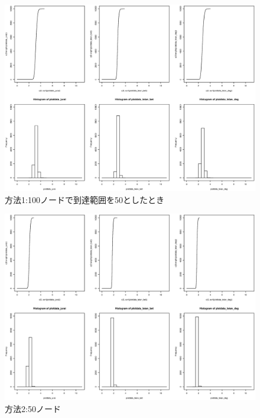 \begin{landscape}
\begin{figure}[H]
  \centering
  \includegraphics[width=1.2\textwidth]{figures/1_100_50.eps}
  \caption{方法1:100ノードで到達範囲を50としたとき}
  \label{fig:plot}
\end{figure}

\begin{figure}[H]
  \centering
  \includegraphics[width=1.2\textwidth]{figures/2_50.eps}
  \caption{方法2:50ノード}
  \label{fig:plot}
\end{figure}


\end{landscape}
